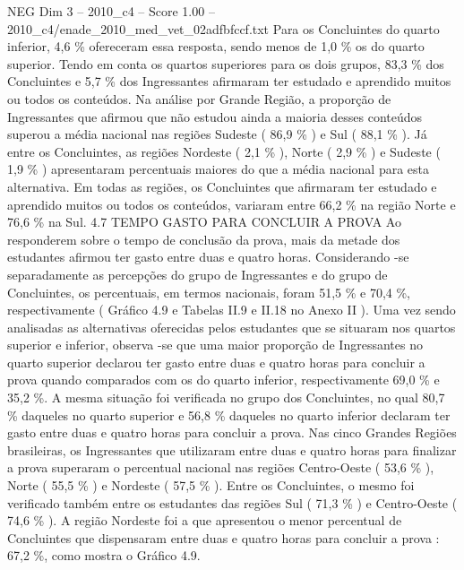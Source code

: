\begin{textsample}{NEG Dim 3 – 2010\_c4 – Score 1.00 – 2010\_c4/enade\_2010\_med\_vet\_02adfbfccf.txt}
Para os Concluintes do quarto inferior, 4,6 \% ofereceram essa resposta, sendo menos de 1,0 \% os do quarto superior.
Tendo em conta os quartos superiores para os dois grupos, 83,3 \% dos Concluintes e 5,7 \% dos Ingressantes afirmaram ter estudado e aprendido muitos ou todos os conteúdos.
Na análise por Grande Região, a proporção de Ingressantes que afirmou que não estudou ainda a maioria desses conteúdos superou a média nacional nas regiões Sudeste ( 86,9 \% ) e Sul ( 88,1 \% ).
Já entre os Concluintes, as regiões Nordeste ( 2,1 \% ), Norte ( 2,9 \% ) e Sudeste ( 1,9 \% ) apresentaram percentuais maiores do que a média nacional para esta alternativa.
Em todas as regiões, os Concluintes que afirmaram ter estudado e aprendido muitos ou todos os conteúdos, variaram entre 66,2 \% na região Norte e 76,6 \% na Sul. 4.7 TEMPO GASTO PARA CONCLUIR A PROVA Ao responderem sobre o tempo de conclusão da prova, mais da metade dos estudantes afirmou ter gasto entre duas e quatro horas.
Considerando -se separadamente as percepções do grupo de Ingressantes e do grupo de Concluintes, os percentuais, em termos nacionais, foram 51,5 \% e 70,4 \%, respectivamente ( Gráfico 4.9 e Tabelas II.9 e II.18 no Anexo II ).
Uma vez sendo analisadas as alternativas oferecidas pelos estudantes que se situaram nos quartos superior e inferior, observa -se que uma maior proporção de Ingressantes no quarto superior declarou ter gasto entre duas e quatro horas para concluir a prova quando comparados com os do quarto inferior, respectivamente 69,0 \% e 35,2 \%.
A mesma situação foi verificada no grupo dos Concluintes, no qual 80,7 \% daqueles no quarto superior e 56,8 \% daqueles no quarto inferior declaram ter gasto entre duas e quatro horas para concluir a prova.
Nas cinco Grandes Regiões brasileiras, os Ingressantes que utilizaram entre duas e quatro horas para finalizar a prova superaram o percentual nacional nas regiões Centro-Oeste ( 53,6 \% ), Norte ( 55,5 \% ) e Nordeste ( 57,5 \% ).
Entre os Concluintes, o mesmo foi verificado também entre os estudantes das regiões Sul ( 71,3 \% ) e Centro-Oeste ( 74,6 \% ).
A região Nordeste foi a que apresentou o menor percentual de Concluintes que dispensaram entre duas e quatro horas para concluir a prova : 67,2 \%, como mostra o Gráfico 4.9.

\end{textsample}
